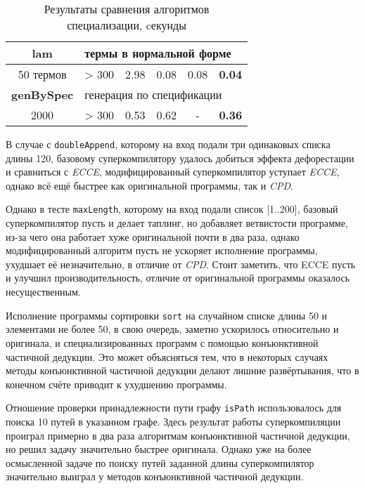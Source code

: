 \begin{table}[h!]
\begin{tabular}{|c|c|c|c|c|c|}
{\bf lam} & \multicolumn{5}{|l|}{термы в нормальной форме} \\ \hline
50 термов & > 300    & 2.98  & 0.08 & 0.08 & {\bf 0.04}   \\
\hline
{\bf genBySpec} & \multicolumn{5}{|l|}{генерация по спецификации} \\ \hline
2000            & > 300 & 0.53 & 0.62 & - & {\bf 0.36} \\ \hline
\end{tabular}
\caption{Результаты сравнения алгоритмов специализации, cекунды}
\label{fig:totalResult}
\end{table}

В случае с \lstinline{doubleAppend}, которому на вход подали три одинаковых списка длины 120,
базовому суперкомпилятору удалось
добиться эффекта дефорестации и сравниться с {\it ECCE}, модифицированный суперкомпилятор
уступает {\it ECCE}, однако всё ещё быстрее как оригинальной программы, так и {\it CPD}.

Однако в тесте \lstinline{maxLength}, которому на вход подали список [1..200], базовый суперкомпилятор пусть и делает
таплинг, но добавляет ветвистости программе, из-за чего она работает хуже оригинальной
почти в два раза, однако модифицированный алгоритм пусть не ускоряет исполнение программы,
ухудшает её незначительно, в отличие от {\it CPD}. Стоит заметить, что ECCE пусть и
улучшил производительность, отличие от оригинальной программы оказалось несущественным.

Исполнение программы сортировки \lstinline{sort} на случайном списке длины 50 и элементами
не более 50, в свою очередь, заметно ускорилось относительно и оригинала, и специализированных
программ с помощью конъюнктивной частичной дедукции. Это может объясняться тем, что в некоторых
случаях методы конъюнктивной частичной дедукции делают лишние развёртывания, что в конечном
счёте приводит к ухудшению программы.

Отношение проверки принадлежности пути графу \lstinline{isPath} использовалось
для поиска 10 путей в указанном графе. Здесь результат работы суперкомпиляции
проиграл примерно в два раза алгоритмам конъюнктивной частичной дедукции,
но решил задачу значительно быстрее оригинала. Однако уже на более
осмысленной задаче по поиску путей заданной длины суперкомпилятор
значительно выиграл у методов конъюнктивной частичной дедукции.


